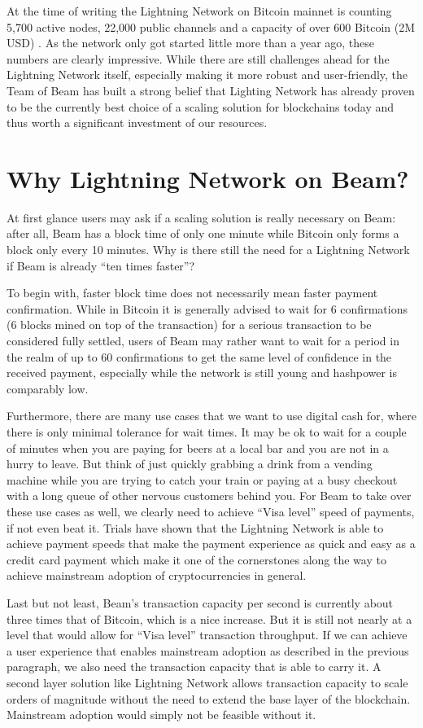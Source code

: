\documentclass[letterpaper]{article}
\begin{document}
At the time of writing the Lightning Network on Bitcoin mainnet is counting 5,700 active nodes, 22,000 public channels and a capacity of over 600 Bitcoin (2M USD) \cite{stats}. As the network only got started little more than a year ago, these numbers are clearly impressive. While there are still challenges ahead for the Lightning Network itself, especially making it more robust and user-friendly, the Team of Beam has built a strong belief that Lighting Network has already proven to be the currently best choice of a scaling solution for blockchains today and thus worth a significant investment of our resources.

\section{Why Lightning Network on Beam?}
At first glance users may ask if a scaling solution is really necessary on Beam: after all, Beam has a block time of only one minute while Bitcoin only forms a block only every 10 minutes. Why is there still the need for a Lightning Network if Beam is already “ten times faster”?

To begin with, faster block time does not necessarily mean faster payment confirmation. While in Bitcoin it is generally advised to wait for 6 confirmations (6 blocks mined on top of the transaction) for a serious transaction to be considered fully settled, users of Beam may rather want to wait for a period in the realm of up to 60 confirmations to get the same level of confidence in the received payment, especially while the network is still young and hashpower is comparably low.

Furthermore, there are many use cases that we want to use digital cash for, where there is only minimal tolerance for wait times. It may be ok to wait for a couple of minutes when you are paying for beers at a local bar and you are not in a hurry to leave. But think of just quickly grabbing a drink from a vending machine while you are trying to catch your train or paying at a busy checkout with a long queue of other nervous customers behind you. For Beam to take over these use cases as well, we clearly need to achieve “Visa level” speed of payments, if not even beat it. Trials have shown that the Lightning Network is able to achieve payment speeds that make the payment experience as quick and easy as a credit card payment which make it one of the cornerstones along the way to achieve mainstream adoption of cryptocurrencies in general.

Last but not least, Beam’s transaction capacity per second is currently about three times that of Bitcoin, which is a nice increase. But it is still not nearly at a level that would allow for “Visa level” transaction throughput. If we can achieve a user experience that enables mainstream adoption as described in the previous paragraph, we also need the transaction capacity that is able to carry it. A second layer solution like Lightning Network allows transaction capacity to scale orders of magnitude without the need to extend the base layer of the blockchain. Mainstream adoption would simply not be feasible without it.
\end{document}
